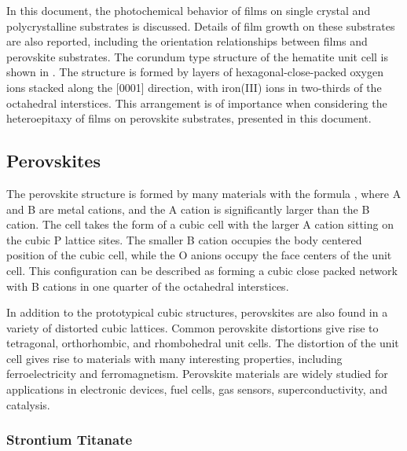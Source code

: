In this document, the photochemical behavior of  films on single crystal and
polycrystalline substrates is discussed. Details of  film growth on these
substrates are also reported, including the orientation relationships between 
films and perovskite substrates. The corundum type structure of the hematite unit cell is
shown in . The structure is formed by layers of
hexagonal-close-packed oxygen ions stacked along the [0001] direction, with iron(III) ions
in two-thirds of the octahedral interstices. This arrangement is of importance when
considering the heteroepitaxy of  films on perovskite substrates, presented in
this document. 

\subsection{Perovskites}\label{subsec:background.perovskites}

The perovskite structure is formed by many materials with the formula , where A
and B are metal cations, and the A cation is significantly larger than the B
cation.\cite{Bhalla:2000ku} The cell takes the form of a cubic cell with the larger A
cation sitting on the cubic P lattice sites. The smaller B cation occupies the body
centered position of the cubic cell, while the O anions occupy the face centers of the
unit cell. This configuration can be described as  forming a cubic close packed
network with B cations in one quarter of the octahedral interstices.

In addition to the prototypical cubic structures, perovskites are also found in a variety
of distorted cubic lattices. Common perovskite distortions give rise to tetragonal,
orthorhombic, and rhombohedral unit cells. The distortion of the unit cell gives rise to
materials with many interesting properties, including ferroelectricity and ferromagnetism.
Perovskite materials are widely studied\cite{Bhalla:2000ku} for applications in electronic
devices,\cite{Kingon:2000wa} fuel cells,\cite{Zhu:2003jz,Jiang:2008fb} gas
sensors,\cite{Fergus:2007tm} superconductivity,\cite{Murphy:1987wc} and
catalysis.\cite{Lombardo:1998uv}

\subsubsection{Strontium Titanate}\label{subsubsec:background.sto}

